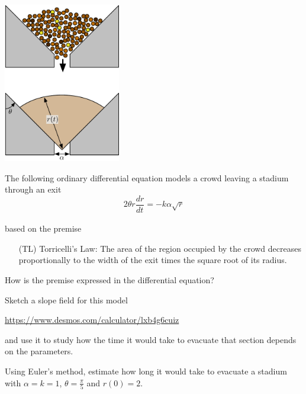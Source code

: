 

\begin{slide}

\question

\begin{center}
	\includegraphics[width=145pt]{images/stadium.pdf}
\end{center}

	The following ordinary differential equation models a crowd leaving a stadium through an exit
	\[
	2 \theta r \frac{dr}{dt_{}} = - k \alpha \sqrt{r}
	\]
	
\begin{slidesonly}
	\bigskip
\end{slidesonly}

	
	based on the premise \\[-20pt]
	\begin{itemize}
		\item[(TL)]	Torricelli's Law: The area of the region occupied by the crowd decreases proportionally to the width of the exit times the square root of its radius. %
	\end{itemize}

	\begin{parts}
		\item How is the premise expressed in the differential equation?
		\item Sketch a slope field for this model

			\url{https://www.desmos.com/calculator/lxb4g6cuiz}

		and use it to study how the time it would take to evacuate that section depends on the parameters.
		
		\item Using Euler's method, estimate how long it would take to evacuate a stadium with $\alpha=k=1$, $\theta=\frac{\pi}{5}$ and $r(0)=2$.
		
\end{parts}

\end{slide}


